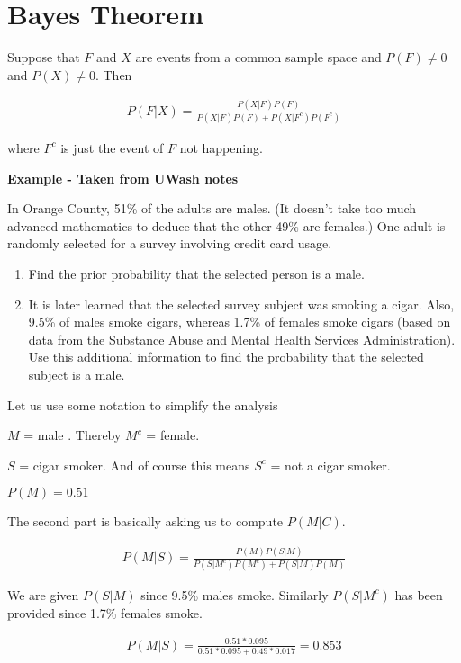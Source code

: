 \documentclass[12pt]{article}
\begin{document}
\section*{Bayes Theorem}

Suppose that $F$ and $X$ are events from a common sample space and $P(F) \neq 0$ and $P(X) \neq 0$. Then

\begin{align*}
P(F|X) = \frac{P(X|F)P(F)}{P(X|F)P(F) + P(X|F^c)P(F^c)}
\end{align*}

where $F^c$ is just the event of $F$ not happening.

\textbf{Example - Taken from UWash notes}

In Orange County, 51\% of the adults are males. (It doesn't take too much advanced
mathematics to deduce that the other 49\% are females.) One adult is randomly selected
for a survey involving credit card usage.
\begin{enumerate}
\item Find the prior probability that the selected person is a male.
\item It is later learned that the selected survey subject was smoking a cigar. Also, 9.5\%
of males smoke cigars, whereas 1.7\% of females smoke cigars (based on data
from the Substance Abuse and Mental Health Services Administration). Use this
additional information to find the probability that the selected subject is a male.
\end{enumerate}

Let us use some notation to simplify the analysis

$M$ = male . Thereby $M^c$ = female. 

$S$ = cigar smoker. And of course this means $S^c$ = not a cigar smoker.

$P(M) = 0.51$

The second part is basically asking us to compute $P(M|C)$.

\begin{align*}
P(M|S) = \frac{P(M) P(S|M)}{P(S|M^c) P(M^c) + P(S|M) P(M)}
\end{align*}

We are given $P(S|M)$ since 9.5\% males smoke. Similarly $P(S|M^c)$ has been provided since 1.7\% females smoke.

\begin{align*}
P(M|S) = \frac{0.51 * 0.095}{0.51 * 0.095 + 0.49 * 0.017}
= 0.853
\end{align*}
\end{document}
